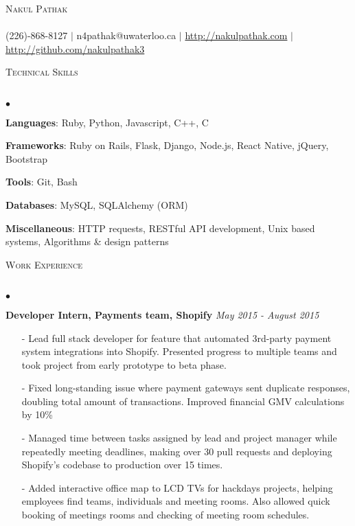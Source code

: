 \documentclass[10pt]{article}
\newcommand{\lineunder}{\vspace*{-8pt} \\ \hspace*{-18pt} \hrulefill \\}
\newcommand{\header}[1]{{\hspace*{-15pt}\vspace*{6pt} \textsc{#1}} \vspace*{-6pt} \lineunder}
\newenvironment{achievements}{\begin{list}{$\bullet$}{\topsep 0pt \itemsep -1.5pt \leftmargin 5pt}}{\vspace*{4pt}\end{list}}
\begin{document}
\small
\smallskip
\vspace*{-45pt}

\begin{center}
	{\Huge \scshape {Nakul Pathak}} \\
\hspace*{-18pt} \hrulefill \\
\vspace{2pt}
\hspace*{-18pt} (226)-868-8127 $|$ n4pathak@uwaterloo.ca $|$ \url{http://nakulpathak.com} $|$  \url{http://github.com/nakulpathak3}
\vspace{-5pt}
\end{center}

\vspace{7pt}

\header{\normalsize Technical Skills}
\begin{achievements}
\item \textbf{Languages}: Ruby, Python, Javascript, C++, C
\item \textbf{Frameworks}: Ruby on Rails, Flask, Django, Node.js, React Native, jQuery, Bootstrap
\item \textbf{Tools}: Git, Bash
\item \textbf{Databases}: MySQL,  SQLAlchemy (ORM)
\item \textbf{Miscellaneous}: HTTP requests, RESTful API development, Unix based systems, Algorithms \& design patterns
\end{achievements}

\vspace{6pt}

\header{\normalsize Work Experience}
\begin{achievements}
\item \textbf{Developer Intern, Payments team, Shopify} \hfill \textit {May 2015 - August 2015}
\begin{itemize}[leftmargin=0cm]
\item[-]Lead full stack developer for feature that automated 3rd-party payment system integrations into Shopify. Presented progress to multiple teams and took project from early prototype to beta phase.
\item[-]Fixed long-standing issue where payment gateways sent duplicate responses, doubling total amount of transactions. Improved financial GMV calculations by 10\%
\item[-]Managed time between tasks assigned by lead and project manager while repeatedly meeting deadlines, making over 30 pull requests and deploying Shopify's codebase to production over 15 times.
\item[-]Added interactive office map to LCD TVs for hackdays projects, helping employees find teams, individuals and meeting rooms. Also allowed quick booking of meetings rooms and checking of meeting room schedules.
\end{itemize}
\end{achievements}
\end{document}

